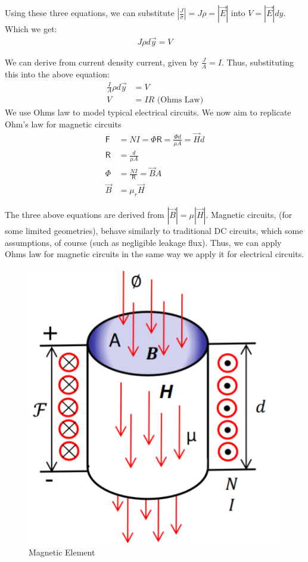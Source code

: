 \documentclass{book}
\begin{document}
Using these three equations, we can substitute $|\frac{J}{\sigma}| =J\rho=|\vec{E}| $ into $V = |\vec{E}| dy$. Which we get:
\begin{align*}
	J \rho d\vec{y} =V 
\end{align*}

We can derive from current density current, given by $\frac{J}{A} = I$. Thus, substituting this into the above equation:
\begin{align*}
	\frac{I}{A} \rho d\vec{y} &= V \\
	V&= IR \text{ (Ohms Law)}
\end{align*}
We use Ohms law to model typical electrical circuits. We now aim to replicate Ohm's law for magnetic circuits
\begin{align*}
	\mathsf{F} &= NI = \Phi \mathsf{R} = \frac{\Phi d}{\mu A} = \vec{H} d\\
	\mathsf{R} &= \frac{d}{\mu A} \\
	\Phi &= \frac{NI}{\mathsf{R}} = \vec{B} A \\
	\vec{B} &= \mu_r \vec{H}
\end{align*}



The three above equations are derived from $|\vec{B}| = \mu |\vec{H}|$. Magnetic circuits, (for some limited geometries), behave similarly to traditional DC circuits, which some assumptions, of course (such as negligible leakage flux). Thus, we can apply Ohms law for magnetic circuits in the same way we apply it for electrical circuits. 

\begin{figure}[h]
	\centering
	\includegraphics[width=0.2\linewidth]{Screenshots/magnetic_OHMS}
	\caption{Magnetic Element}
	\label{fig:magneticohms}
\end{figure}
\end{document}
